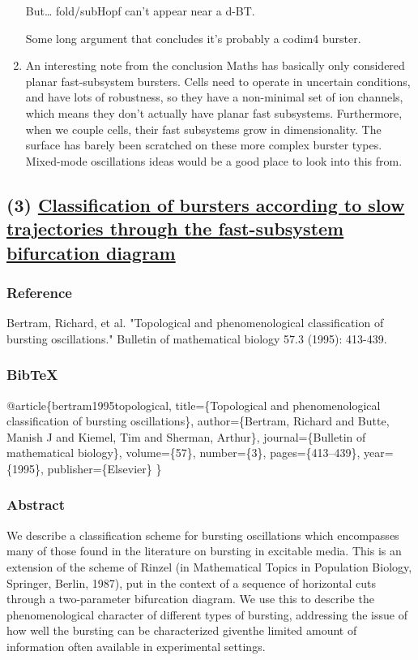 \documentclass[11pt]{article}
\begin{document}
\begin{enumerate}
But\ldots{} fold/subHopf can't appear near a d-BT. 

Some long argument that concludes it's probably a codim4 burster.

\item An interesting note from the conclusion
\label{sec:orgb58481c}
Maths has basically only considered planar fast-subsystem bursters.
Cells need to operate in uncertain conditions, and have lots of robustness, so they have a non-minimal set of ion channels, which means they don't actually have planar fast subsystems.
Furthermore, when we couple cells, their fast subsystems grow in dimensionality.
The surface has barely been scratched on these more complex burster types.
Mixed-mode oscillations ideas would be a good place to look into this from.
\end{enumerate}

\subsection{(3) \href{https://link.springer.com/content/pdf/10.1007/BF02460633.pdf}{Classification of bursters according to slow trajectories through the fast-subsystem bifurcation diagram}}
\label{sec:org89b8af4}
\subsubsection{Reference}
\label{sec:org5401e0b}
Bertram, Richard, et al. "Topological and phenomenological classification of bursting oscillations." Bulletin of mathematical biology 57.3 (1995): 413-439.

\subsubsection{BibTeX}
\label{sec:orgce91356}
@article\{bertram1995topological,
  title=\{Topological and phenomenological classification of bursting oscillations\},
  author=\{Bertram, Richard and Butte, Manish J and Kiemel, Tim and Sherman, Arthur\},
  journal=\{Bulletin of mathematical biology\},
  volume=\{57\},
  number=\{3\},
  pages=\{413--439\},
  year=\{1995\},
  publisher=\{Elsevier\}
\}

\subsubsection{Abstract}
\label{sec:org71210df}
We describe a classification scheme for bursting oscillations which
encompasses many of those found in the literature on bursting in
excitable media. This is an extension of the scheme of Rinzel (in
Mathematical Topics in Population Biology, Springer, Berlin, 1987),
put in the context of a sequence of horizontal cuts through a
two-parameter bifurcation diagram. We use this to describe the
phenomenological character of different types of bursting, addressing
the issue of how well the bursting can be characterized giventhe
limited amount of information often available in experimental
settings.
\end{document}

